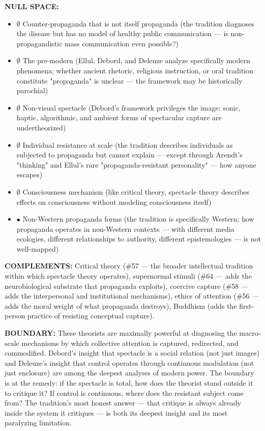 \textbf{NULL SPACE:}

\begin{itemize}[nosep,leftmargin=*]
  \item $\emptyset$ Counter-propaganda that is not itself propaganda (the tradition diagnoses the disease but has no model of healthy public communication — is non-propagandistic mass communication even possible?)
  \item $\emptyset$ The pre-modern (Ellul, Debord, and Deleuze analyze specifically modern phenomena; whether ancient rhetoric, religious instruction, or oral tradition constitute "propaganda" is unclear — the framework may be historically parochial)
  \item $\emptyset$ Non-visual spectacle (Debord's framework privileges the image; sonic, haptic, algorithmic, and ambient forms of spectacular capture are undertheorized)
  \item $\emptyset$ Individual resistance at scale (the tradition describes individuals as subjected to propaganda but cannot explain — except through Arendt's "thinking" and Ellul's rare "propaganda-resistant personality" — how anyone escapes)
  \item $\emptyset$ Consciousness mechanism (like critical theory, spectacle theory describes effects on consciousness without modeling consciousness itself)
  \item $\bullet$ Non-Western propaganda forms (the tradition is specifically Western; how propaganda operates in non-Western contexts — with different media ecologies, different relationships to authority, different epistemologies — is not well-mapped)
\end{itemize}


\textbf{COMPLEMENTS:} Critical theory (\#57 — the broader intellectual tradition within which spectacle theory operates), supernormal stimuli (\#64 — adds the neurobiological substrate that propaganda exploits), coercive capture (\#58 — adds the interpersonal and institutional mechanisms), ethics of attention (\#56 — adds the moral weight of what propaganda destroys), Buddhism (adds the first-person practice of resisting conceptual capture).


\textbf{BOUNDARY:} These theorists are maximally powerful at diagnosing the macro-scale mechanisms by which collective attention is captured, redirected, and commodified. Debord's insight that spectacle is a social relation (not just images) and Deleuze's insight that control operates through continuous modulation (not just enclosure) are among the deepest analyses of modern power. The boundary is at the remedy: if the spectacle is total, how does the theorist stand outside it to critique it? If control is continuous, where does the resistant subject come from? The tradition's most honest answer — that critique is always already inside the system it critiques — is both its deepest insight and its most paralyzing limitation.


